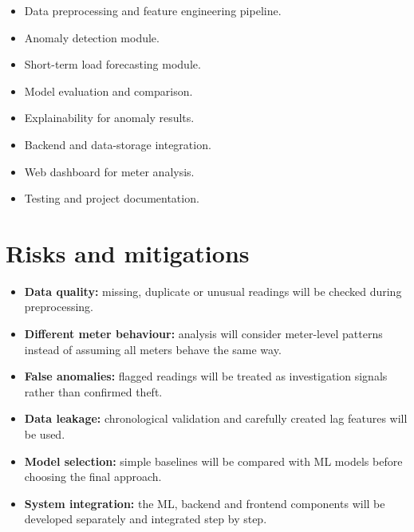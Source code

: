 \documentclass[11pt,a4paper]{article}
\begin{document}
\begin{itemize}[leftmargin=0.7cm]

    \item Data preprocessing and feature engineering pipeline.

    \item Anomaly detection module.

    \item Short-term load forecasting module.

    \item Model evaluation and comparison.

    \item Explainability for anomaly results.

    \item Backend and data-storage integration.

    \item Web dashboard for meter analysis.

    \item Testing and project documentation.

\end{itemize}

\section{Risks and mitigations}

\begin{itemize}[leftmargin=0.7cm]

    \item \textbf{Data quality:} missing, duplicate or unusual
    readings will be checked during preprocessing.

    \item \textbf{Different meter behaviour:} analysis will consider
    meter-level patterns instead of assuming all meters behave the
    same way.

    \item \textbf{False anomalies:} flagged readings will be treated
    as investigation signals rather than confirmed theft.

    \item \textbf{Data leakage:} chronological validation and
    carefully created lag features will be used.

    \item \textbf{Model selection:} simple baselines will be compared
    with ML models before choosing the final approach.

    \item \textbf{System integration:} the ML, backend and frontend
    components will be developed separately and integrated step by
    step.

\end{itemize}
\end{document}
